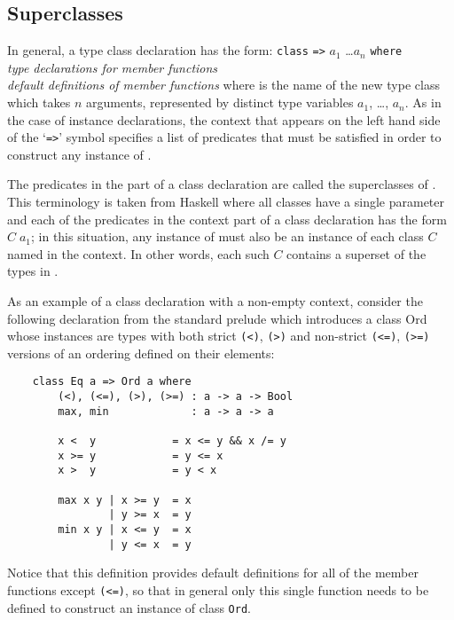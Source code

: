 \subsection{Superclasses}
In general, a type class declaration has the form:
\BQ
     \verb"class"  \verb"=>" 
              $a_1$ \dots $a_n$ \verb"where" \\
      {\em type declarations for member functions} \\
      {\em default definitions of member functions}
\EQ
where  is the name of the new type class which takes $n$  arguments,
represented by distinct type variables $a_1$, \dots, $a_n$.  As in the case  of
instance declarations, the context that appears on the left  hand  side
of the `\verb"=>"'  symbol  specifies  a  list  of  predicates  that  must  be
satisfied in order to construct any instance of .

The predicates in the  part of a class  declaration  are  called
the superclasses of .  This  terminology  is  taken  from  Haskell
where all classes have a single parameter and each of the predicates in
the context part of a class declaration has the  form  $C\; a_1$;  in  this
situation, any instance of  must also be an instance of each class
$C$ named in the context.   
In  other  words,  each  such  $C$  contains  a
superset of the types in .

As an example of a class declaration with a non-empty context, consider
the following declaration from the standard prelude which introduces  a
class Ord whose instances are types  with  both  strict  \verb"(<)",  
\verb"(>)"  and
non-strict  \verb"(<=)",  \verb"(>=)"  
versions  of  an  ordering  defined  on  their
elements:
\begin{verbatim}
    class Eq a => Ord a where
        (<), (<=), (>), (>=) : a -> a -> Bool
        max, min             : a -> a -> a

        x <  y            = x <= y && x /= y
        x >= y            = y <= x
        x >  y            = y < x

        max x y | x >= y  = x
                | y >= x  = y
        min x y | x <= y  = x
                | y <= x  = y
\end{verbatim}
Notice that this definition provides default definitions for all of the
member functions except \verb"(<=)", so  that  in  general  only  this  single
function needs to be defined to construct an instance of class \verb"Ord".

